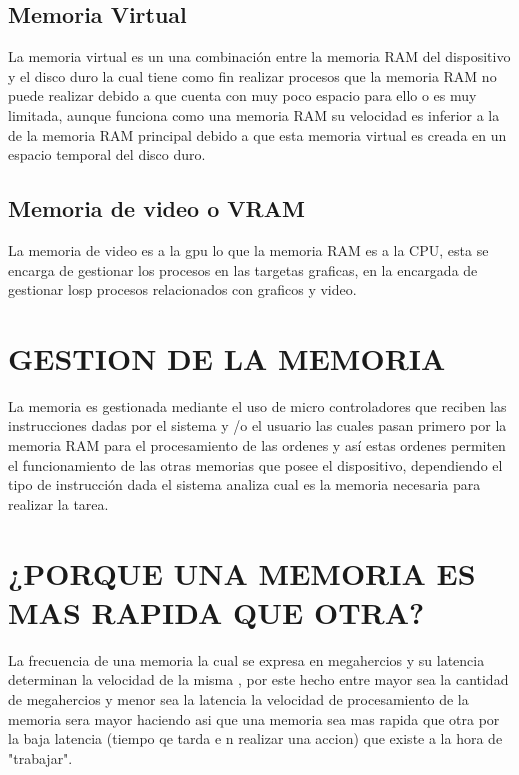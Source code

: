\documentclass{article}
\begin{document}
\subsection{Memoria Virtual}
La memoria virtual es un una combinación entre la memoria RAM del dispositivo y el disco duro la cual tiene como fin realizar procesos que la memoria RAM no puede realizar debido a que cuenta con muy poco espacio para ello o es muy limitada, aunque funciona como una memoria RAM su velocidad es inferior a la de la memoria RAM principal debido a que esta memoria virtual es creada en un espacio temporal del disco duro. \cite{Virtual}

\subsection{Memoria de video o VRAM}
La memoria de video es a la gpu lo que la memoria RAM es a la CPU, esta se encarga de gestionar los procesos en las targetas graficas, en la encargada de gestionar losp procesos relacionados con graficos y video. \cite{Video}

\section{GESTION DE LA MEMORIA}
La memoria es gestionada mediante el uso de micro controladores que reciben las instrucciones dadas por el sistema y /o el usuario las cuales pasan primero por la memoria RAM para el procesamiento de las ordenes y así estas ordenes permiten el funcionamiento de las otras memorias que posee el dispositivo, dependiendo el tipo de instrucción dada el sistema analiza cual es la memoria necesaria para realizar la tarea. \cite{Augusto}

\section{¿PORQUE UNA MEMORIA ES MAS RAPIDA QUE OTRA?}
La  frecuencia  de una memoria la cual se expresa en megahercios y su latencia determinan la velocidad de la misma , por este hecho entre mayor sea la cantidad de megahercios y menor sea la latencia la velocidad de procesamiento de la memoria sera mayor haciendo asi que una memoria sea mas rapida que otra por la baja latencia (tiempo qe tarda e n realizar una accion) que existe a la hora de "trabajar".
\end{document}
